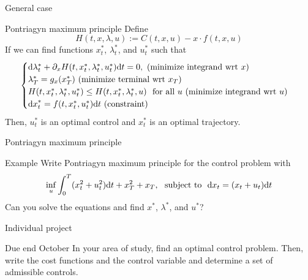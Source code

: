 \documentclass[color=usenames,dvipsnames]{beamer}
\newcommand{\dd}{\text{\normalfont d}}
\newcommand{\dt}{\text{\normalfont d}t}
\newcommand{\dx}{\text{\normalfont d}x}
\begin{document}
\begin{frame}{General case}
    \begin{block}
        {Pontriagyn maximum principle}
        Define
        \[
        H(t,x,\lambda,u) := C(t,x,u)-x\cdot f(t,x,u)
        \]
        If we can find functions $x^*_t$, $\lambda^*_t$, and $u^*_t$ such that 
    \[
    \begin{cases}
        {\dd}\lambda^*_t+ \partial_x H(t,x^*_t,\lambda^*_t,u^*_t){{\dt}}=0,~(\textrm{minimize integrand wrt $x$})\\
        \lambda^*_T=g_x(x_T^*) ~(\textrm{minimize terminal wrt $x_T$})\\
        H(t,x^*_t,\lambda^*_t,u^*_t)\le H(t,x^*_t,\lambda^*_t,u)~\textrm{ for all } u ~(\textrm{minimize integrand wrt $u$})\\
        {\dx}^*_t = f(t,x^*_t,u^*_t) {{\dt}} ~(\textrm{constraint})
        \end{cases}
    \]
    Then, $u^*_t$ is an optimal control and $x^*_t$ is an optimal trajectory.
    \end{block}
\end{frame}
\begin{frame}{Pontriagyn maximum principle}
\begin{block}
    {Example}
    Write Pontriagyn maximum principle for the control problem with 
    \[
     \inf_{u}\int_0^T(x_t^2 + u_t^2 ){{\dt}} + x^2_T + x_T,~\text{ subject to  }~{\dx}_t=( x_t +  u_t){{\dt}}
    \]
    Can you solve the equations and find $x^*$, $\lambda^*$, and $u^*$?
\end{block}
    
\end{frame}
\begin{frame}{Individual project}
\begin{block}{Due end October}
     In your area of study, find an optimal control problem. Then, write the cost functions and the control variable and determine a set of admissible controls. 
\end{block}
\end{frame}
\end{document}
